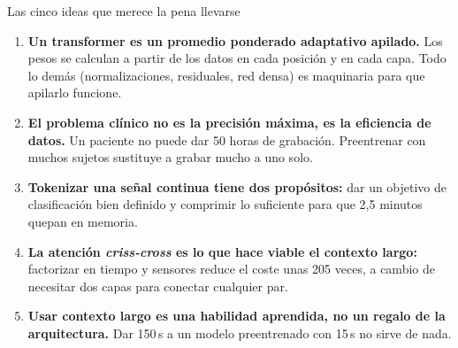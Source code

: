 \documentclass[aspectratio=169,10pt]{beamer}
\newcommand{\term}[1]{\textbf{\color{deepgreen}#1}}
\begin{document}
\begin{frame}[c]{Las cinco ideas que merece la pena llevarse}
  \small
  \begin{enumerate}
    \setlength{\itemsep}{2.2mm}
    \item \term{Un transformer es un promedio ponderado adaptativo apilado.} Los pesos se calculan a partir de los datos en cada posición y en cada capa. Todo lo demás (normalizaciones, residuales, red densa) es maquinaria para que apilarlo funcione.
    \item \term{El problema clínico no es la precisión máxima, es la eficiencia de datos.} Un paciente no puede dar 50 horas de grabación. Preentrenar con muchos sujetos sustituye a grabar mucho a uno solo.
    \item \term{Tokenizar una señal continua tiene dos propósitos:} dar un objetivo de clasificación bien definido y comprimir lo suficiente para que 2,5 minutos quepan en memoria.
    \item \term{La atención \emph{criss-cross} es lo que hace viable el contexto largo:} factorizar en tiempo y sensores reduce el coste unas 205 veces, a cambio de necesitar dos capas para conectar cualquier par.
    \item \term{Usar contexto largo es una habilidad aprendida, no un regalo de la arquitectura.} Dar 150\,s a un modelo preentrenado con 15\,s no sirve de nada.
  \end{enumerate}
\end{frame}
\end{document}
